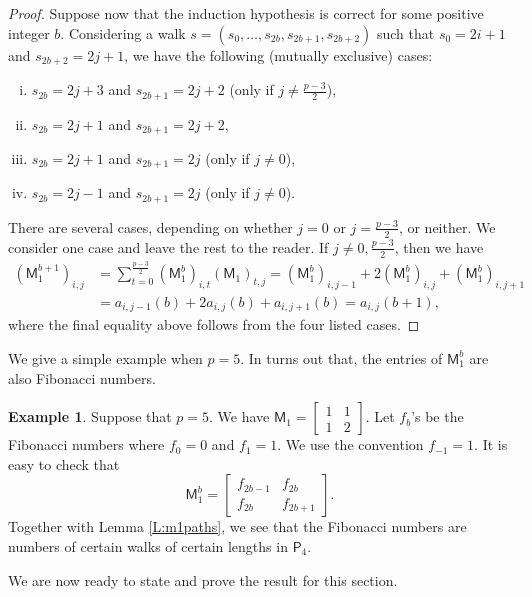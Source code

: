 \documentclass[12pt,reqno]{amsart}
\newcommand{\M}{\mathsf{M}}
\theoremstyle{definition}
\newtheorem{eg}[thm]{Example}
\numberwithin{equation}{section}
\begin{document}
\begin{proof}
    Suppose now that the induction hypothesis is correct for some positive integer $b$.  Considering a walk $s=(s_0,\ldots,s_{2b},s_{2b+1},s_{2b+2})$ such that $s_0=2i+1$ and $s_{2b+2}=2j+1$, we have the following (mutually exclusive) cases:
	\begin{enumerate}[(i)]
		\item $s_{2b}=2j+3$ and $s_{2b+1}=2j+2$ (only if $j \neq \frac{p-3}{2}$),
		\item $s_{2b} = 2j+1$ and $s_{2b+1}=2j+2$,
		\item $s_{2b} = 2j+1$ and $s_{2b+1} = 2j$ (only if $j \neq 0$),
		\item $s_{2b}=2j-1$ and $s_{2b+1}=2j$ (only if $j \neq 0$).
	\end{enumerate} There are several cases, depending on whether $j=0$ or $j=\frac{p-3}{2}$, or neither. We consider one case and leave the rest to the reader. If $j\neq 0,\frac{p-3}{2}$, then we have
	\begin{align*}
		(\M_1^{b+1})_{i,j}&=\sum_{t=0}^{\frac{p-3}{2}}(\M_1^b)_{i,t}(\M_1)_{t,j}= (\M_1^b)_{i,j-1}+2(\M_1^b)_{i,j}+(\M_1^b)_{i,j+1} \\
		&= a_{i,j-1}(b) + 2a_{i,j}(b) + a_{i,j+1}(b)= a_{i,j}(b+1),
	\end{align*} where the final equality above follows from the four listed cases. 
    \end{proof}
    
We give a simple example when $p=5$. In turns out that, the entries of $\M_1^b$ are also Fibonacci numbers. 

\begin{eg}
    Suppose that $p=5$. We have $\M_1=\begin{bmatrix}
        1&1\\ 1&2
    \end{bmatrix}$. Let $f_b$'s be the Fibonacci numbers where $f_0=0$ and $f_1=1$. We use the convention $f_{-1}=1$. It is easy to check that \[\M_1^b=\begin{bmatrix}
        f_{2b-1}&f_{2b}\\ f_{2b}& f_{2b+1}
    \end{bmatrix}.\] Together with Lemma \ref{L:m1paths}, we see that the Fibonacci numbers are numbers of certain walks of certain lengths in $\mathsf{P}_4$. 
\end{eg}

We are now ready to state and prove the result for this section. 
\end{document}
